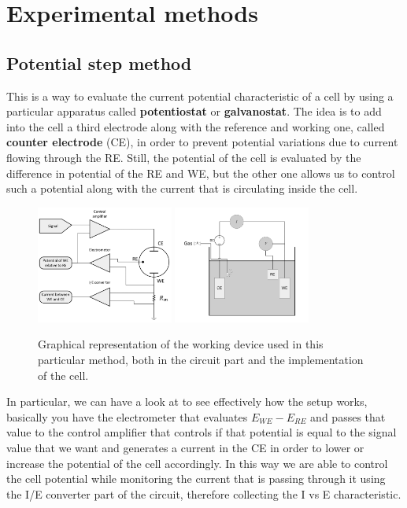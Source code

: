 \section{Experimental methods}

\subsection{Potential step method}

This is a way to evaluate the current potential characteristic of a cell by using a particular apparatus called \textbf{potentiostat} or \textbf{galvanostat}. The idea is to add into the cell a third electrode along with the reference and working one, called \textbf{counter electrode} (CE), in order to prevent potential variations due to current flowing through the RE. Still, the potential of the cell is evaluated by the difference in potential of the RE and WE, but the other one allows us to control such a potential along with the current that is circulating inside the cell.
\begin{figure}[t]
    \centering
    \includegraphics[width=0.4\textwidth]{Immagini/Potentiometer.png}
    \includegraphics[width=0.4\textwidth]{Immagini/CellaTreElettrodi.png}
    \caption{
        Graphical representation of the working device used in this particular method, both in the circuit part and the implementation of the cell.
    }
    \label{eq:PotGal}
\end{figure}
In particular, we can have a look at  to see effectively how the setup works, basically you have the electrometer that evaluates $E_{WE} - E_{RE}$ and passes that value to the control amplifier that controls if that potential is equal to the signal value that we want and generates a current in the CE in order to lower or increase the potential of the cell accordingly. In this way we are able to control the cell potential while monitoring the current that is passing through it using the I/E converter part of the circuit, therefore collecting the I vs E characteristic.

